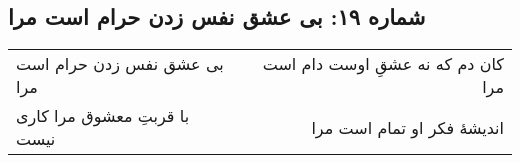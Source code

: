\begin{center}
\section*{شماره ۱۹: بی عشق نفس زدن حرام است مرا}
\label{sec:019}
\begin{longtable}{l p{0.5cm} r}
بی عشق نفس زدن حرام است مرا
&&
کان دم که نه عشقِ اوست دام است مرا
\\
با قربتِ معشوق مرا کاری نیست
&&
اندیشهٔ فکر او تمام است مرا
\\
\end{longtable}
\end{center}
